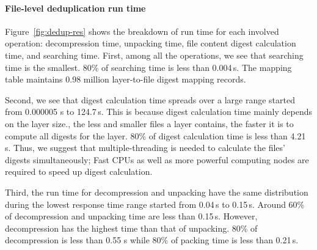 %

\paragraph{File-level deduplication run time}

%
Figure~\ref{fig:dedup-res} shows the breakdown of run time for each
involved operation: decompression time, unpacking time, file content digest
calculation time, and searching time.
First, among all the operations, we see that searching time is the
smallest. 
%
80\% of searching time is less than 0.004\,s. 
%
The mapping table
maintains 0.98 million layer-to-file digest mapping records. 
%
%
%

Second, we see that digest calculation time spreads over a large range started
from 0.000005 s to 124.7\,s. 
%
This is because digest calculation time mainly
depends on the layer size., \ie the less and smaller files a layer
contains, the faster it is to compute all digests for the layer.
%
%
%
80\% of digest calculation time is less than 4.21\,s. 
%
Thus, we suggest that multiple-threading is needed to calculate the files'
digests simultaneously; 
%
Fast CPUs as well as more powerful computing nodes are
required to speed up digest calculation.

Third, the run time for decompression and unpacking have the same distribution
during the lowest response time range started from 0.04\,s to 0.15\,s. 
%
Around 60\% of decompression and unpacking time are less than 0.15\,s. 
%
However, decompression has the highest time than that of unpacking. 
%
80\% of decompression is less than 0.55 s while 80\% of packing time is less than 0.21\,s. 

